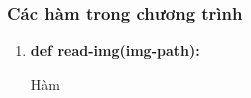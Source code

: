 \subsubsection{Các hàm trong chương trình}
\begin{enumerate}
	\item \textbf{def read-img(img-path):} \par
	Hàm
	
\end{enumerate}

